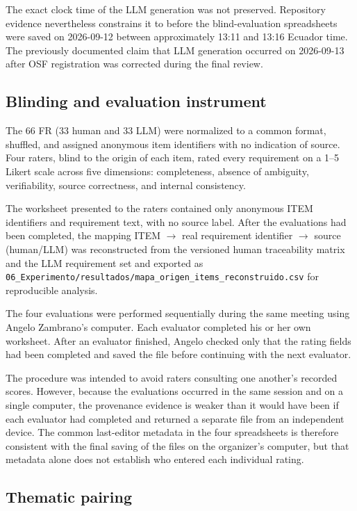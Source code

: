 \documentclass[pdflatex,sn-basic]{sn-jnl}
\begin{document}
The exact clock time of the LLM generation was not preserved. Repository evidence nevertheless constrains it to before the blind-evaluation spreadsheets were saved on 2026-09-12 between approximately 13:11 and 13:16 Ecuador time. The previously documented claim that LLM generation occurred on 2026-09-13 after OSF registration was corrected during the final review.

\subsection{Blinding and evaluation instrument}
\label{sec:blinding}

The 66 FR (33 human and 33 LLM) were normalized to a common format, shuffled, and assigned anonymous item identifiers with no indication of source. Four raters, blind to the origin of each item, rated every requirement on a 1--5 Likert scale across five dimensions: completeness, absence of ambiguity, verifiability, source correctness, and internal consistency.

The worksheet presented to the raters contained only anonymous ITEM identifiers and requirement text, with no source label. After the evaluations had been completed, the mapping ITEM $\rightarrow$ real requirement identifier $\rightarrow$ source (human/LLM) was reconstructed from the versioned human traceability matrix and the LLM requirement set and exported as \texttt{06\_Experimento/resultados/mapa\_origen\_items\_reconstruido.csv} for reproducible analysis.

The four evaluations were performed sequentially during the same meeting using Angelo Zambrano's computer. Each evaluator completed his or her own worksheet. After an evaluator finished, Angelo checked only that the rating fields had been completed and saved the file before continuing with the next evaluator.

The procedure was intended to avoid raters consulting one another's recorded scores. However, because the evaluations occurred in the same session and on a single computer, the provenance evidence is weaker than it would have been if each evaluator had completed and returned a separate file from an independent device. The common last-editor metadata in the four spreadsheets is therefore consistent with the final saving of the files on the organizer's computer, but that metadata alone does not establish who entered each individual rating.

\subsection{Thematic pairing}
\end{document}
